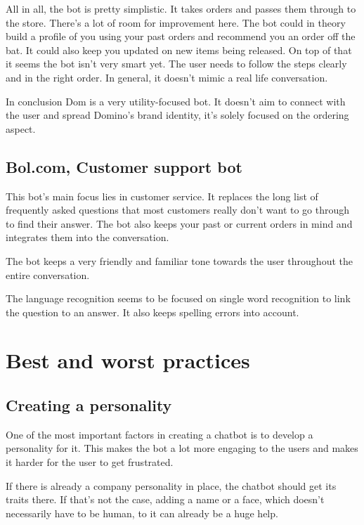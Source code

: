 All in all, the bot is pretty simplistic. It takes orders and passes them through to the store. There's a lot of room for improvement here. The bot could in theory build a profile of you using your past orders and recommend you an order off the bat. It could also keep you updated on new items being released. On top of that it seems the bot isn't very smart yet. The user needs to follow the steps clearly and in the right order. In general, it doesn't mimic a real life conversation.

In conclusion Dom is a very utility-focused bot. It doesn't aim to connect with the user and spread Domino's brand identity, it's solely focused on the ordering aspect.

\subsection{Bol.com, Customer support bot}

This bot's main focus lies in customer service. It replaces the long list of frequently asked questions that most customers really don't want to go through to find their answer. The bot also keeps your past or current orders in mind and integrates them into the conversation.

The bot keeps a very friendly and familiar tone towards the user throughout the entire conversation.

The language recognition seems to be focused on single word recognition to link the question to an answer. It also keeps spelling errors into account.

\section{Best and worst practices}

\subsection{Creating a personality}

One of the most important factors in creating a chatbot is to develop a personality for it. This makes the bot a lot more engaging to the users and makes it harder for the user to get frustrated.

If there is already a company personality in place, the chatbot should get its traits there. If that's not the case, adding a name or a face, which doesn't necessarily have to be human, to it can already be a huge help.

